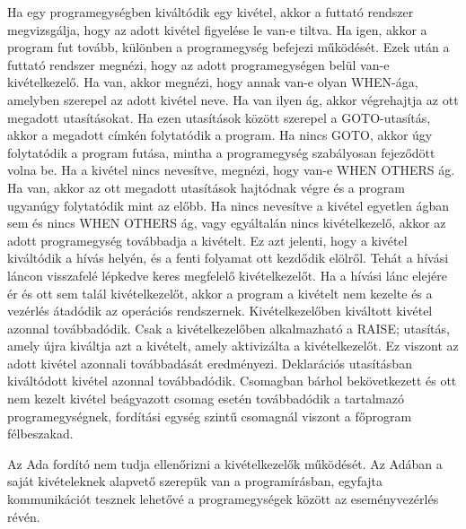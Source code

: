 Ha egy programegységben kiváltódik egy kivétel, akkor a futtató rendszer megvizsgálja, hogy az adott kivétel figyelése le van-e tiltva. Ha igen, akkor a program fut tovább, különben a programegység befejezi működését. Ezek után a futtató rendszer megnézi, hogy az adott programegységen belül van-e kivételkezelő. Ha van, akkor megnézi, hogy annak van-e olyan WHEN-ága, amelyben szerepel az adott kivétel neve. Ha van ilyen ág, akkor végrehajtja az ott megadott utasításokat. Ha ezen utasítások között szerepel a GOTO-utasítás, akkor a megadott címkén folytatódik a program. Ha nincs GOTO, akkor úgy folytatódik a program futása, mintha a programegység szabályosan fejeződött volna be. Ha a kivétel nincs nevesítve, megnézi, hogy van-e WHEN OTHERS ág. Ha van, akkor az ott megadott utasítások hajtódnak végre és a program ugyanúgy folytatódik mint az előbb. Ha nincs nevesítve a kivétel egyetlen ágban sem és nincs WHEN OTHERS ág, vagy egyáltalán nincs kivételkezelő, akkor az adott programegység továbbadja a kivételt. Ez azt jelenti, hogy a kivétel kiváltódik a hívás helyén, és a fenti folyamat ott kezdődik elölről. Tehát a hívási láncon visszafelé lépkedve keres megfelelő kivételkezelőt. Ha a hívási lánc elejére ér és ott sem talál kivételkezelőt, akkor a program a kivételt nem kezelte és a vezérlés átadódik az operációs rendszernek. Kivételkezelőben kiváltott kivétel azonnal továbbadódik. Csak a kivételkezelőben alkalmazható a RAISE; utasítás, amely újra kiváltja azt a kivételt, amely aktivizálta a kivételkezelőt. Ez viszont az adott kivétel azonnali továbbadását eredményezi. Deklarációs utasításban kiváltódott kivétel azonnal továbbadódik. Csomagban bárhol bekövetkezett és ott nem kezelt kivétel beágyazott csomag esetén továbbadódik a tartalmazó programegységnek, fordítási egység szintű csomagnál viszont a főprogram félbeszakad.

Az Ada fordító nem tudja ellenőrizni a kivételkezelők működését. Az Adában a saját kivételeknek alapvető szerepük van a programírásban, egyfajta kommunikációt tesznek lehetővé a programegységek között az eseményvezérlés révén.